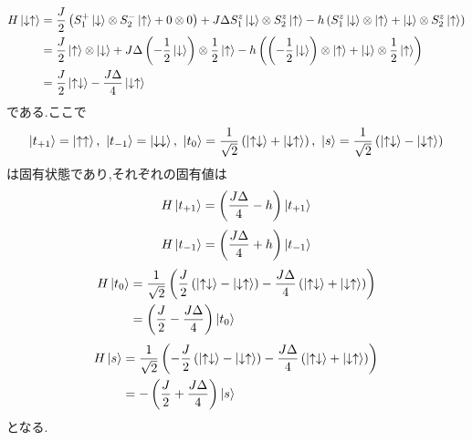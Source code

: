\documentclass[uplatex,a4j,11pt,dvipdfmx]{jsarticle}
\newcommand{\up}{\uparrow}
\newcommand{\dn}{\downarrow}
\begin{document}
\begin{align}
  \begin{split}
    H\Ket{\dn\up}&=\frac{J}{2}\left(S_1^+\Ket{\dn}\otimes S_2^-\Ket{\up}+0\otimes0\right)+J\Delta S_1^z\Ket{\dn}\otimes S_2^z\Ket{\up}-h\left(S_1^z\Ket{\dn}\otimes\Ket{\up}+\Ket{\dn}\otimes S_2^z\Ket{\up}\right)\\
    &=\frac{J}{2}\Ket{\up}\otimes\Ket{\dn}+J\Delta\left(-\frac{1}{2}\Ket{\dn}\right)\otimes\frac{1}{2}\Ket{\up}-h\left(\left(-\frac{1}{2}\Ket{\dn}\right)\otimes\Ket{\up}+\Ket{\dn}\otimes\frac{1}{2}\Ket{\up}\right)\\
    &=\frac{J}{2}\Ket{\up\dn}-\frac{J\Delta}{4}\Ket{\dn\up}
  \end{split}
\end{align}
である.ここで
\begin{align}
  \begin{split}
    \Ket{t_{+1}}=\Ket{\up\up},\ 
    \Ket{t_{-1}}=\Ket{\dn\dn},\ 
    \Ket{t_0}=\frac{1}{\sqrt{2}}\left(\Ket{\up\dn}+\Ket{\dn\up}\right),\ 
    \Ket{s}=\frac{1}{\sqrt{2}}\left(\Ket{\up\dn}-\Ket{\dn\up}\right)
  \end{split}
\end{align}
は固有状態であり,それぞれの固有値は
\begin{align}
  H\Ket{t_{+1}}=\left(\frac{J\Delta}{4}-h\right)\Ket{t_{+1}}
\end{align}
\begin{align}
  H\Ket{t_{-1}}=\left(\frac{J\Delta}{4}+h\right)\Ket{t_{-1}}
\end{align}
\begin{align}
  \begin{split}
    H\Ket{t_0}&=\frac{1}{\sqrt{2}}\left(\frac{J}{2}\left(\Ket{\up\dn}-\Ket{\dn\up}\right)-\frac{J\Delta}{4}\left(\Ket{\up\dn}+\Ket{\dn\up}\right)\right)\\
    &=\left(\frac{J}{2}-\frac{J\Delta}{4}\right)\Ket{t_0}
  \end{split}
\end{align}
\begin{align}
  \begin{split}
    H\Ket{s}&=\frac{1}{\sqrt{2}}\left(-\frac{J}{2}\left(\Ket{\up\dn}-\Ket{\dn\up}\right)-\frac{J\Delta}{4}\left(\Ket{\up\dn}+\Ket{\dn\up}\right)\right)\\
    &=-\left(\frac{J}{2}+\frac{J\Delta}{4}\right)\Ket{s}
  \end{split}
\end{align}
となる.
\end{document}
